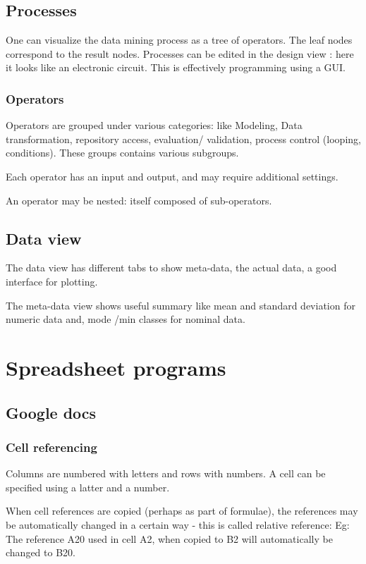 \documentclass[oneside, article]{memoir}
\begin{document}
\section{Processes}
One can visualize the data mining process as a tree of operators. The leaf nodes correspond to the result nodes. Processes can be edited in the design view : here it looks like an electronic circuit. This is effectively programming using a GUI.

\subsection{Operators}
Operators are grouped under various categories: like Modeling, Data transformation, repository access, evaluation/ validation, process control (looping, conditions). These groups contains various subgroups.

Each operator has an input and output, and may require additional settings.

An operator may be nested: itself composed of sub-operators.

\section{Data view}
The data view has different tabs to show meta-data, the actual data, a good interface for plotting.

The meta-data view shows useful summary like mean and standard deviation for numeric data and, mode /min classes for nominal data.

\chapter{Spreadsheet programs}
\section{Google docs}
\subsection{Cell referencing}
Columns are numbered with letters and rows with numbers. A cell can be specified using a latter and a number.

When cell references are copied (perhaps as part of formulae), the references may be automatically changed in a certain way - this is called relative reference: Eg: The reference A20 used in cell A2, when copied to B2 will automatically be changed to B20.
\end{document}
